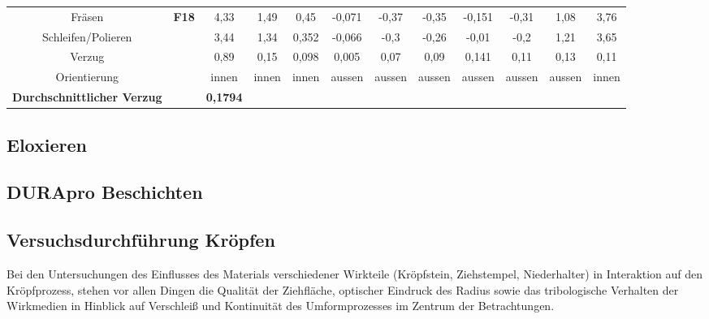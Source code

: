 \documentclass[12pt,a4paper,parskip]{scrartcl}
\begin{document}
\begin{table}
\begin{tabular}{cccccccccccc}
\midrule
 Fräsen& \textbf{F18} &4,33  & 1,49 &0,45  & -0,071 &-0,37  &-0,35  &-0,151  & -0,31 &1,08 &3,76  \\
Schleifen/Polieren &&3,44 &1,34 &0,352  &-0,066  & -0,3 &-0,26  &-0,01  &-0,2 &1,21 &3,65  \\
Verzug && 0,89 &0,15  &0,098  & 0,005 &0,07 &0,09  &0,141 &0,11  &0,13 & 0,11 \\
Orientierung &&innen  &innen  &innen &aussen  &aussen  &aussen  & aussen &aussen  & aussen &innen \\
\textbf{Durchschnittlicher Verzug} && \textbf{0,1794} &&&&&&&&&\\
\bottomrule

















\end{tabular}
\end{table}












\newpage


















\newpage




  
 
\subsection{Eloxieren}
\subsection{DURApro  Beschichten}



\newpage
\subsection{Versuchsdurchführung Kröpfen}
Bei den Untersuchungen des Einflusses des Materials verschiedener Wirkteile (Kröpfstein, Ziehstempel, Niederhalter) in Interaktion  auf den Kröpfprozess, stehen vor allen Dingen die Qualität der Ziehfläche, optischer Eindruck des Radius  sowie das tribologische Verhalten der Wirkmedien in Hinblick auf Verschleiß und Kontinuität des Umformprozesses im Zentrum der Betrachtungen.
\end{document}
